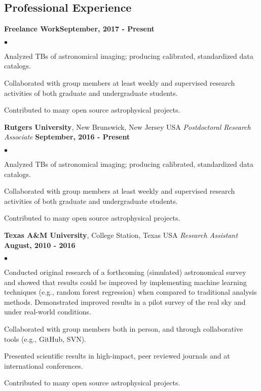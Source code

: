\documentclass[margin,line, 10pt]{res}
\newenvironment{list2}{
  \begin{list}{$\bullet$}{%
      \setlength{\itemsep}{0in}
      \setlength{\parsep}{0in} \setlength{\parskip}{0in}
      \setlength{\topsep}{0in} \setlength{\partopsep}{0in} 
      \setlength{\leftmargin}{0.2in}}}{\end{list}}
\begin{document}
\begin{resume}
\section{Professional \newline Experience}
\textbf{Freelance Work}\hfill \textbf{September, 2017 - Present}\newline
    \begin{list2}
    	\vspace*{-5mm}
    	\item Analyzed TBs of astronomical imaging; producing calibrated, standardized data catalogs.
    	\item Collaborated with group members at least weekly and supervised research activities of both graduate and undergraduate students.
    	\item Contributed to many open source astrophysical projects.
    \end{list2}
    \vspace*{-4mm}
\textbf{Rutgers University}, New Brunswick, New Jersey USA \newline
\textit{Postdoctoral Research Associate} \hfill \textbf{September, 2016 - Present}\newline
    \begin{list2}
    	\vspace*{-5mm}
    	\item Analyzed TBs of astronomical imaging; producing calibrated, standardized data catalogs.
    	\item Collaborated with group members at least weekly and supervised research activities of both graduate and undergraduate students.
    	\item Contributed to many open source astrophysical projects.
    \end{list2}
\vspace*{-4mm}

\textbf{Texas A\&M University}, College Station, Texas USA\newline
\textit{Research Assistant} \hfill \textbf{August, 2010 - 2016}\newline
    \begin{list2}
    	\vspace*{-5mm}
    	\item Conducted original research of a forthcoming (simulated) astronomical survey and showed that results could be improved by implementing machine learning techniques (e.g., random forest regression) when compared to traditional analysis methods. Demonstrated improved results in a pilot survey of the real sky and under real-world conditions.    
    	\item Collaborated with group members both in person, and through collaborative tools (e.g., GitHub, SVN).
    	\item Presented scientific results in high-impact, peer reviewed journals and at international conferences.
    	\item Contributed to many open source astrophysical projects.
    \end{list2}
\vspace*{-4mm}


\end{resume}
\end{document}
